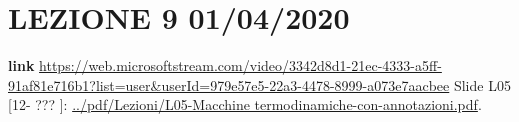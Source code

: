 \section*{LEZIONE 9 01/04/2020}
\textbf{link} \url{https://web.microsoftstream.com/video/3342d8d1-21ec-4333-a5ff-91af81e716b1?list=user&userId=979e57e5-22a3-4478-8999-a073e7aacbee}\newline
\newline
Slide L05 [12- ??? ]: \url{../pdf/Lezioni/L05-Macchine termodinamiche-con-annotazioni.pdf}.\newline
\newline

